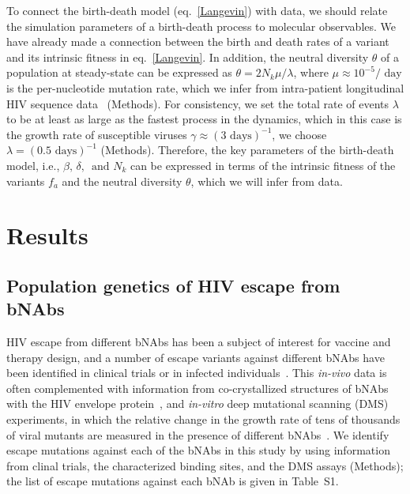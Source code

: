 \documentclass[aps,prx,noshowpacs,twocolumn,nofootinbib]{revtex4-2}
\begin{document}
To connect the birth-death model (eq.~\ref{Langevin}) with data, we should relate the simulation parameters of a birth-death process to  molecular observables. We have already made a connection between the birth and death rates of a variant  and its   intrinsic fitness in eq.~\ref{Langevin}.  In addition, the neutral diversity $\theta$ of a population at steady-state can  be expressed as $ \theta = {2 N_k \mu}/{ \lambda}$, where $\mu\approx 10^{-5} / \text{ day} $ is the per-nucleotide mutation rate, which we infer from intra-patient longitudinal  HIV sequence data~\cite{Zanini:2015gg}  (Methods). For consistency,  we set the  total rate of events $\lambda$ to be at least as large as the fastest process in the dynamics, which in this case is the growth rate of susceptible viruses $\gamma  \approx (3 \text{ days})^{-1}$, we choose $\lambda  = (0.5 \text{ days})^{-1}$ (Methods). Therefore, the key parameters of the birth-death model, i.e., $ \beta,\, \delta,\, \text{ and } N_k$ can be expressed in terms of the intrinsic fitness of the variants $f_a$ and the neutral diversity $\theta$, which we will infer from data. 


\section{Results}
\subsection*{Population genetics of HIV escape from bNAbs} 
HIV escape from different bNAbs has been a subject of interest for vaccine and therapy design, and a number of escape variants against different bNAbs have been identified  in clinical trials or in infected individuals~\cite{lynchHIV1FitnessCost2015,Caskey:2015hm,scheidHIV1Antibody3BNC1172016,Caskey:2017el,bar-onSafetyAntiviralActivity2018}. This {\em in-vivo} data is often complemented with information from co-crystallized structures of bNAbs with the HIV envelope protein~\cite{Pancera:2017dw}, and {\em in-vitro} deep mutational scanning (DMS) experiments, in which the relative change in the growth rate of tens of thousands of viral mutants are measured in the presence of different bNAbs~\cite{Dingens:2017bk,Dingens:2019fd,Schommers:2020er}.  We identify escape mutations against each of the bNAbs in this study by using information from clinal trials,  the characterized binding sites, and the DMS assays (Methods); the list of escape mutations against each bNAb is given in Table~S1. 
\end{document}
